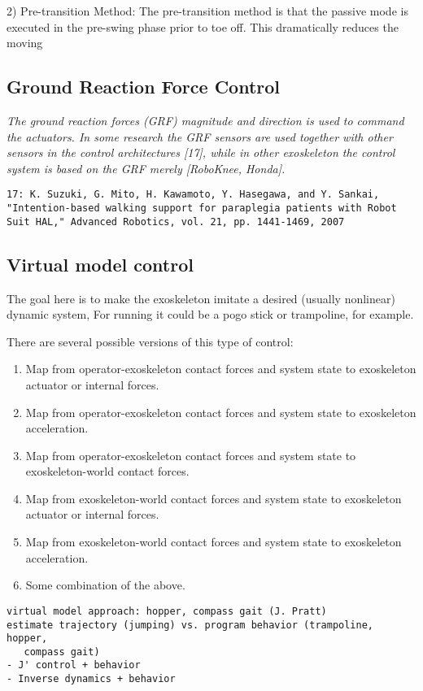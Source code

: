 \documentclass[letterpaper,12pt,fullpage]{article}
\begin{document}
2) Pre-transition Method: The pre-transition method is
that the passive mode is executed in the pre-swing phase
prior to toe off. This dramatically reduces the moving

\subsection{Ground Reaction Force Control}

{\it
The ground reaction
forces (GRF) magnitude and direction is used to command the
actuators. In some research the GRF sensors are used
together with other sensors in the control architectures [17],
while in other exoskeleton the control system is based on the
GRF merely [RoboKnee, Honda].
}
\begin{verbatim}
17: K. Suzuki, G. Mito, H. Kawamoto, Y. Hasegawa, and Y. Sankai,
"Intention-based walking support for paraplegia patients with Robot
Suit HAL," Advanced Robotics, vol. 21, pp. 1441-1469, 2007
\end{verbatim}

\subsection{Virtual model control}

The goal here is to make the exoskeleton imitate a desired (usually nonlinear)
dynamic system,
For running it could be a pogo stick or trampoline, for example.

There are several possible versions of this type of control:
\begin{enumerate}
\item
Map from operator-exoskeleton contact forces and system state
to exoskeleton actuator or internal forces.
\item
Map from operator-exoskeleton contact forces and system state
to exoskeleton acceleration.
\item
Map from operator-exoskeleton contact forces and system state
to exoskeleton-world contact forces.
\item
Map from exoskeleton-world contact forces and system state to exoskeleton actuator or internal forces.
\item
Map from exoskeleton-world contact forces and system state to exoskeleton acceleration.
\item
Some combination of the above.
\end{enumerate}

\begin{verbatim}
virtual model approach: hopper, compass gait (J. Pratt)
estimate trajectory (jumping) vs. program behavior (trampoline, hopper,
   compass gait)
- J' control + behavior
- Inverse dynamics + behavior
\end{verbatim}
\end{document}

